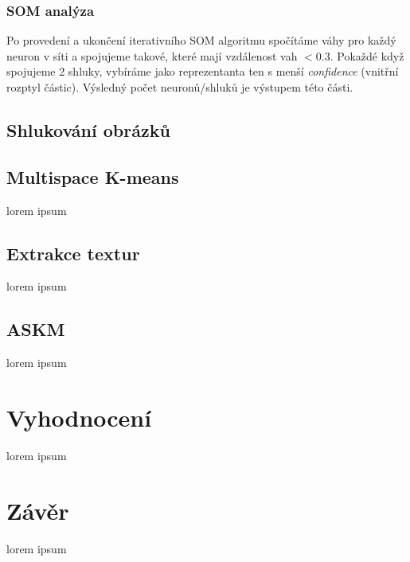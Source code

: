 \documentclass[fleqn,numbers=noenddot,headinclude,%
				11pt,a4paper,footinclude,%
				cleardoublepage=empty,abstractoff %
                ]{scrartcl}
\begin{document}
\subsubsection{SOM analýza}
Po provedení a ukončení iterativního SOM algoritmu spočítáme váhy pro každý neuron v síti a spojujeme takové, které mají vzdálenost vah $<0.3$. Pokaždé když spojujeme 2 shluky, vybíráme jako reprezentanta ten s menší \textit{confidence} (vnitřní rozptyl částic). Výsledný počet neuronů/shluků je výstupem této části.

\subsection{Shlukování obrázků}
\label{sub:kmeans}


\subsection{Multispace K-means}
\label{sub:multi-kmeans}
lorem ipsum

\subsection{Extrakce textur}
\label{sub:textury}
lorem ipsum

\subsection{ASKM}
\label{sub:askm}
lorem ipsum


\section{Vyhodnocení}
\label{sec:vyhodnoceni}
lorem ipsum

\section{Závěr}
\label{sec:zaver}
lorem ipsum
%
\end{document}
